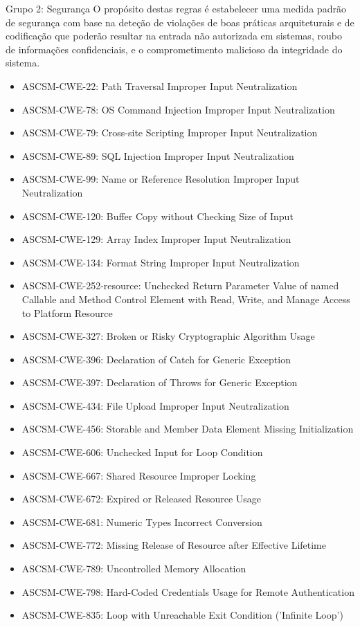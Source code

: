 \documentclass[openany,10pt,a4paper]{article}
\begin{document}
\begin{longtable}
\begin{appendix}
Grupo 2: Segurança
O propósito destas regras é estabelecer uma medida padrão de segurança com base na deteção de violações de boas práticas arquiteturais e de codificação que poderão resultar na entrada não autorizada em sistemas, roubo de informações confidenciais, e o comprometimento malicioso da integridade do sistema.
\begin{itemize}
	\setlength\itemsep{0em}
	\item ASCSM-CWE-22: Path Traversal Improper Input Neutralization
	\item ASCSM-CWE-78: OS Command Injection Improper Input Neutralization
	\item ASCSM-CWE-79: Cross-site Scripting Improper Input Neutralization
	\item ASCSM-CWE-89: SQL Injection Improper Input Neutralization
	\item ASCSM-CWE-99: Name or Reference Resolution Improper Input Neutralization
	\item ASCSM-CWE-120: Buffer Copy without Checking Size of Input
	\item ASCSM-CWE-129: Array Index Improper Input Neutralization
	\item ASCSM-CWE-134: Format String Improper Input Neutralization
	\item ASCSM-CWE-252-resource: Unchecked Return Parameter Value of named Callable and Method Control Element with Read, Write, and Manage Access to Platform Resource
	\item ASCSM-CWE-327: Broken or Risky Cryptographic Algorithm Usage
	\item ASCSM-CWE-396: Declaration of Catch for Generic Exception
	\item ASCSM-CWE-397: Declaration of Throws for Generic Exception
	\item ASCSM-CWE-434: File Upload Improper Input Neutralization
	\item ASCSM-CWE-456: Storable and Member Data Element Missing Initialization
	\item ASCSM-CWE-606: Unchecked Input for Loop Condition
	\item ASCSM-CWE-667: Shared Resource Improper Locking
	\item ASCSM-CWE-672: Expired or Released Resource Usage
	\item ASCSM-CWE-681: Numeric Types Incorrect Conversion
	\item ASCSM-CWE-772: Missing Release of Resource after Effective Lifetime
	\item ASCSM-CWE-789: Uncontrolled Memory Allocation
	\item ASCSM-CWE-798: Hard-Coded Credentials Usage for Remote Authentication
	\item ASCSM-CWE-835: Loop with Unreachable Exit Condition ('Infinite Loop')
\end{itemize} 


\end{appendix}
\end{longtable}
\end{document}
